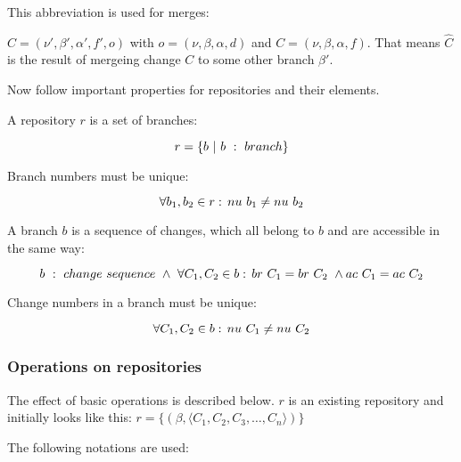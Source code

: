\documentclass[fleqn, 10pt, a4paper]{report} \usepackage{amssymb}
\begin{document}
This abbreviation is used for merges:

$\hat C = (\nu', \beta', \alpha', f', o)$ with $o=(\nu, \beta, \alpha,
d)$ and $C=(\nu, \beta, \alpha, f)$. That means $\hat C$ is the result
of mergeing change $C$ to some other branch $\beta'$.

Now follow important properties for repositories and their elements.

A repository $r$ is a set of branches:

\begin{displaymath}
  r = \{b \ |\ b\ :\ \mathnormal{branch}\}
\end{displaymath}

Branch numbers must be unique:

\begin{displaymath}
  \forall b_1, b_2 \in r:\, \mathnormal{nu}\ b_1 \neq \mathnormal{nu}\ b_2
\end{displaymath}

A branch $b$ is a sequence of changes, which all belong to $b$ and are
accessible in the same way:

\begin{displaymath}
  b\ :\ \mathnormal{change}\ \mathnormal{sequence}\ \wedge\
  \forall C_1, C_2 \in b:\, \mathnormal{br}\ C_1 = \mathnormal{br}\ C_2\ \wedge
  \mathnormal{ac}\ C_1 = \mathnormal{ac}\ C_2
\end{displaymath}

Change numbers in a branch must be unique:

\begin{displaymath}
  \forall C_1, C_2 \in b:\, \mathnormal{nu}\ C_1 \neq
  \mathnormal{nu}\ C_2
\end{displaymath}

\subsubsection{Operations on repositories}

The effect of basic operations is described below. $r$ is an existing
repository and initially looks like this: $r = \{(\beta, \langle C_1,
C_2, C_3, \ldots, C_n\rangle )\}$

The following notations are used:
\end{document}
